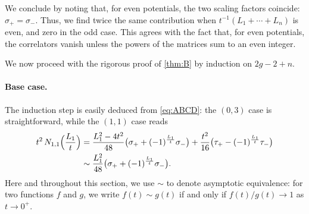 \documentclass[a4paper,11pt,english]{article}
\theoremstyle{plain}
\theoremstyle{definition}
\theoremstyle{plain}
\begin{document}
We conclude by noting that, for even potentials, the two scaling factors coincide: $\sigma_+ = \sigma_-$. Thus, we find twice the same contribution when $t^{-1}(L_1 + \cdots + L_n)$ is even, and zero in the odd case. This agrees with the fact that, for even potentials, the correlators vanish unless the powers of the matrices sum to an even integer.

We now proceed with the rigorous proof of \cref{thm:B} by induction on $2g-2+n$.

\paragraph{Base case.} The induction step is easily deduced from \cref{eq:ABCD}: the $(0,3)$ case is straightforward, while the $(1,1)$ case reads
\begin{equation}
\begin{split}
    t^{2} \,
    N_{1,1}\Bigl( \frac{L_1}{t} \Bigr)
    &=
    \frac{L_1^2 - 4t^2}{48} \bigl( \sigma_+ + (-1)^{\frac{L_1}{t}} \sigma_- \bigr)
        +
        \frac{t^2}{16} \bigl( \tau_+ - (-1)^{\frac{L_1}{t}} \tau_- \bigr)
        \\
    &\sim
    \frac{L_1^2}{48} \bigl( \sigma_+ + (-1)^{\frac{L_1}{t}} \sigma_- \bigr).
\end{split}
\end{equation}
Here and throughout this section, we use $\sim$ to denote asymptotic equivalence: for two functions $f$ and $g$, we write $f(t) \sim g(t)$ if and only if $f(t)/g(t) \to 1$ as $t \to 0^+$.
\end{document}
